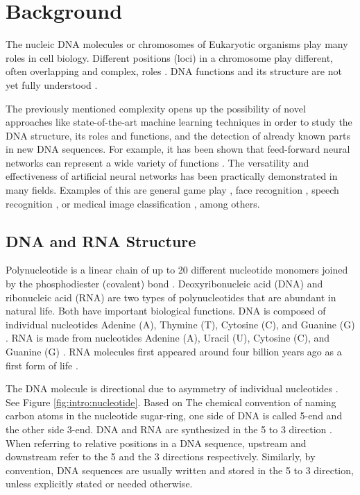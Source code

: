\chapter{\label{ch:background}Background}

\minitoc

The nucleic DNA molecules or chromosomes of Eukaryotic organisms play many
roles in cell biology. Different positions (loci) in a chromosome play
different, often overlapping and complex, roles \cite{pennisi2007dna}. DNA
functions and its structure are not yet fully understood
\cite{slijepcevic2018genome}.

The previously mentioned complexity opens up the possibility of novel
approaches like state-of-the-art machine learning techniques in order to study
the DNA structure, its roles and functions, and the detection of already known
parts in new DNA sequences. For example, it has been shown that feed-forward
neural networks can represent a wide variety of functions
\cite{cybenko1989approximation}. The versatility and effectiveness of
artificial neural networks has been practically demonstrated in many fields.
Examples of this are general game play \cite{silver2016mastering}, face
recognition \cite{sun2015deepid3}, speech recognition
\cite{xiong2016achieving}, or medical image classification
\cite{bychkov2018deep}, among others.

\section{\label{ch:background:dna-rna}DNA and RNA Structure}

Polynucleotide is a linear chain of up to 20 different nucleotide monomers
joined by the phosphodiester (covalent) bond
\cite[p.~308,p.~347]{king2006dictionary}. Deoxyribonucleic acid (DNA) and
ribonucleic acid (RNA) are two types of polynucleotides that are abundant in
natural life. Both have important biological functions. DNA is composed of
individual nucleotides Adenine (A), Thymine (T), Cytosine (C), and Guanine (G)
\cite[p.~4,~p.~20,~p.~107]{pollard2016cell}. RNA is made from nucleotides
Adenine (A), Uracil (U), Cytosine (C), and Guanine (G)
\cite[p.~11]{jankowski1996clinical}. RNA molecules first appeared around four
billion years ago as a first form of life \cite[p.~412]{king2006dictionary}.

The DNA molecule is directional due to asymmetry of individual nucleotides
\cite[p.~42]{pollard2016cell}. See Figure \ref{fig:intro:nucleotide}. Based on
The chemical convention of naming carbon atoms in the nucleotide sugar-ring,
one side of DNA is called 5\textquotesingle{}-end and the other side
3\textquotesingle{}-end. DNA and RNA are synthesized in the 5\textquotesingle{}
to 3\textquotesingle{} direction \cite[p.~167,~p.~728]{pollard2016cell}. When
referring to relative positions in a DNA sequence, upstream and downstream
refer to the 5\textquotesingle{} and the 3\textquotesingle{} directions
respectively. Similarly, by convention, DNA sequences are usually written and
stored in the 5\textquotesingle{} to 3\textquotesingle{} direction, unless
explicitly stated or needed otherwise.

